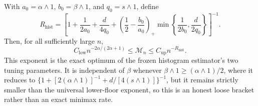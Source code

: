 With \(a_0=\alpha\wedge1\), \(b_0=\beta\wedge1\), and \(q_0=s\wedge1\), define
\[
R_{\mathrm{hist}}
=
\left[
1+\frac{1}{2a_0}+\frac{d}{4q_0}
+
\left(\frac12-\frac{b_0}{a_0}\right)_+
\min\left\{\frac{1}{2b_0},\frac{d}{2q_0}\right\}
\right]^{-1}.
\]
Then, for all sufficiently large \(n\),
\[
C_{\mathrm{low}}n^{-2\alpha/(2\alpha+1)}
\le\mathcal M_n
\le C_{\mathrm{up}}n^{-R_{\mathrm{hist}}}.
\]
This exponent is the exact optimum of the frozen histogram estimator's two tuning parameters. It is independent of \(\beta\) whenever \(\beta\wedge1\ge(\alpha\wedge1)/2\), where it reduces to \(\{1+[2(\alpha\wedge1)]^{-1}+d/[4(s\wedge1)]\}^{-1}\), but it remains strictly smaller than the universal lower-floor exponent, so this is an honest loose bracket rather than an exact minimax rate.